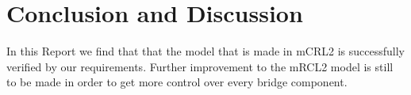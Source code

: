 \section{Conclusion and Discussion}
\label{sec:conclusion}

In this Report we find that that the model that is made in mCRL2 is successfully verified by our requirements. Further improvement to the mRCL2 model is still to be made in order to get more control over every bridge component.

